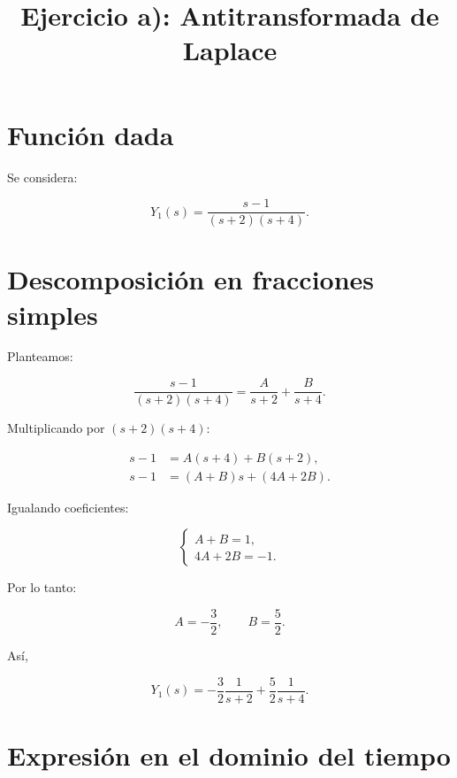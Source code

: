 \documentclass[12pt,a4paper]{article}
\title{Ejercicio a): Antitransformada de Laplace}
\author{}
\date{}
\begin{document}
\maketitle

\section*{Función dada}

Se considera:

\begin{equation}
    Y_1(s)=\frac{s-1}{(s+2)(s+4)}.
\end{equation}

\section*{Descomposición en fracciones simples}

Planteamos:

\begin{equation}
    \frac{s-1}{(s+2)(s+4)}
    =\frac{A}{s+2}+\frac{B}{s+4}.
\end{equation}

Multiplicando por $(s+2)(s+4)$:

\begin{align}
    s-1 &= A(s+4)+B(s+2),\\
    s-1 &= (A+B)s+(4A+2B).
\end{align}

Igualando coeficientes:

\begin{equation}
    \begin{cases}
        A+B=1,\\
        4A+2B=-1.
    \end{cases}
\end{equation}

Por lo tanto:

\begin{equation}
    A=-\frac{3}{2},\qquad B=\frac{5}{2}.
\end{equation}

Así,

\begin{equation}
    Y_1(s)=-\frac{3}{2}\frac{1}{s+2}
    +\frac{5}{2}\frac{1}{s+4}.
\end{equation}

\section*{Expresión en el dominio del tiempo}
\end{document}
